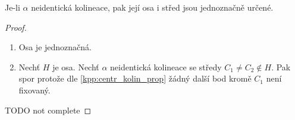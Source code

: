 \begin{consequence}
    Je-li $\alpha$ neidentická kolineace, pak její osa i střed jsou jednoznačně určené.
\end{consequence}
\begin{proof}
	\begin{enumerate}
		\item Osa je jednoznačná.
		\item Nechť $H$ je osa.
			Nechť $\alpha$ neidentická kolineace se středy $C_1 \ne C_2 \notin H$.
			Pak spor protože dle \cref{kpp:centr_kolin_prop} žádný další bod kromě $C_1$ není fixovaný.
	\end{enumerate}
    TODO not complete
\end{proof}


